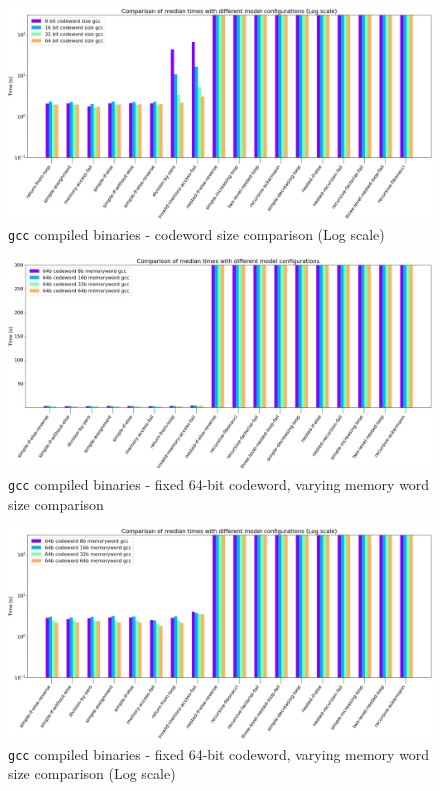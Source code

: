 \documentclass[12pt]{article}
\begin{document}
\begin{figure}
    \includegraphics[width=\linewidth]{assets/benches/codeword_gcc_log.png}
    \centering
    \caption{
        \texttt{gcc} compiled binaries - codeword size comparison (Log scale)
    }
    \label{fig:codeword_gcc_log}
\end{figure}

\begin{figure}
    \includegraphics[width=\linewidth]{assets/benches/64b_codeword_memword_gcc_linear.png}
    \centering
    \caption{
        \texttt{gcc} compiled binaries - fixed 64-bit codeword, varying memory
        word size comparison
    }
    \label{fig:64b_codeword_memword_gcc_linear}
\end{figure}

\begin{figure}
    \includegraphics[width=\linewidth]{assets/benches/64b_codeword_memword_gcc_log.png}
    \centering
    \caption{
        \texttt{gcc} compiled binaries - fixed 64-bit codeword, varying memory
        word size comparison (Log scale)
    }
    \label{fig:64b_codeword_memword_gcc_log}
\end{figure}
\end{document}
